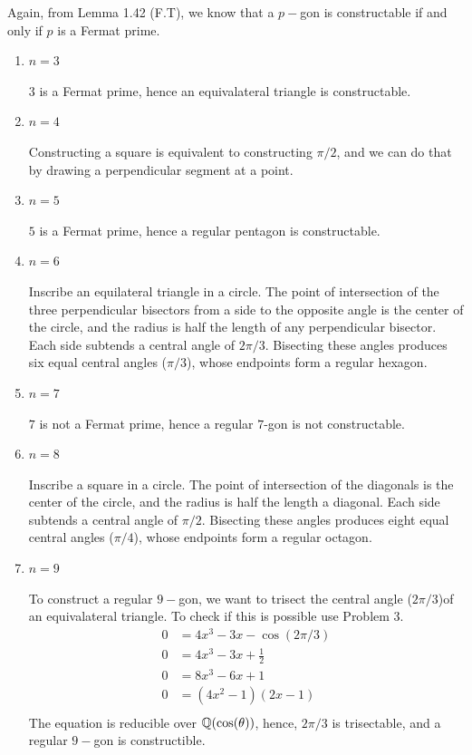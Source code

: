 \documentclass[12pt]{article}
\begin{document}
\begin{solution}
    \bbni

    Again, from Lemma 1.42 (F.T), we know that a $p-$gon is constructable if and only if $p$ is a Fermat prime. 
    \begin{enumerate}
        \item $n = 3$
        
        $3$ is a Fermat prime, hence an equivalateral triangle is constructable. 

        \item $n = 4$
        
        Constructing a square is equivalent to constructing $\pi/2$, and we can do that by drawing a perpendicular segment at a point. 

        \item $n = 5$
        
        $5$ is a Fermat prime, hence a regular pentagon is constructable. 

        \item $n = 6$
        
        Inscribe an equilateral triangle in a circle. The point of intersection of the three perpendicular bisectors from a side to the opposite angle is the center of the circle, and the radius is half the length of any perpendicular bisector. Each side subtends a central angle of $2\pi/3$. Bisecting these angles produces six equal central angles ($\pi/3$), whose endpoints form a regular hexagon.

        \item $n = 7$
         
        $7$ is not a Fermat prime, hence a regular $7$-gon is not constructable. 

        \item $n = 8$
        
        Inscribe a square in a circle. The point of intersection of the diagonals is the center of the circle, and the radius is half the length a diagonal. Each side subtends a central angle of $\pi/2$. Bisecting these angles produces eight equal central angles ($\pi/4$), whose endpoints form a regular octagon.

        \item $n = 9$
        
        To construct a regular $9-$gon, we want to trisect the central angle ($2\pi/3$)of an equivalateral triangle. To check if this is possible use Problem $3$.
        \begin{align*}
            0 &= 4x^3 - 3x - \cos(2\pi/3) \\
            0 &= 4x^3 - 3x + \frac{1}{2} \\ 
            0 &= 8x^3 - 6x + 1 \\ 
            0 &= (4x^2 - 1)(2x  -1) \\ 
        \end{align*}
        The equation is reducible over $\mathbb Q(\cos(\theta))$, hence, $2\pi/3$ is trisectable, and a regular $9-$gon is constructible.


\end{enumerate}
\end{solution}
\end{document}
